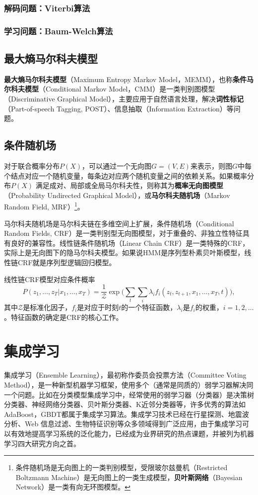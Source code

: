 \subsection{解码问题：Viterbi算法}
\subsection{学习问题：Baum-Welch算法}

\section{最大熵马尔科夫模型}
\noindent \textbf{最大熵马尔科夫模型}（Maximum Entropy Markov Model，MEMM），也称\textbf{条件马尔科夫模型}（Conditional Markov Model，CMM）是一类判别图模型（Discriminative Graphical Model），主要应用于自然语言处理，解决\textbf{词性标记}（Part-of-speech Tagging, POST）、信息抽取（Information Extraction）等问题。

\section{条件随机场}
\begin{definition}[概率无向图模型]
对于联合概率分布$P(X)$，可以通过一个无向图$G=(V,E)$来表示，则图$G$中每个结点对应一个随机变量，每条边对应两个随机变量之间的依赖关系。如果概率分布$P(X)$ 满足成对、局部或全局马尔科夫性，则称其为\textbf{概率无向图模型}（Probability Undirected Graphical Model），或\textbf{马尔科夫随机场}（Markov Random Field, MRF）\footnote{条件随机场是无向图上的一类判别模型，受限玻尔兹曼机（Restricted Boltzmann Machine）是无向图上的一类生成模型，\textbf{贝叶斯网络}（Bayesian Network）是一类有向无环图模型。}。
\end{definition}
马尔科夫随机场是马尔科夫链在多维空间上扩展，条件随机场（Conditional Random Fields, CRF）是一类判别型无向图模型，对于重叠的、非独立性特征具有良好的兼容性。线性链条件随机场（Linear Chain CRF）是一类特殊的CRF，实际上是无向图下的隐马尔科夫模型。如果说HMM是序列型朴素贝叶斯模型，线性链CRF就是序列型逻辑回归模型。

线性链CRF模型对应条件概率
\[
    P(z_1,\ldots,z_T|x_1,\ldots,x_T) = \frac{1}{\mathcal Z} \exp\bigg(\sum\limits_t \sum\limits_i \lambda_i f_i(z_t,z_{t+1},x_1,\ldots,x_T,t )\bigg),
\]
其中$\mathcal Z$是标准化因子，$f_i$是对应于时刻$t$的一个特征函数，$\lambda_i$是$f_i$的权重，$i=1,2,\ldots$。特征函数的确定是CRF的核心工作。

\chapter{集成学习}
集成学习（Ensemble Learning），最初称作委员会投票方法（Committee Voting Method），是一种新型机器学习框架，使用多个（通常是同质的）弱学习器解决同一个问题。比如在分类模型集成学习中，经常使用的弱学习器（分类器）是决策树分类器、神经网络分类器、贝叶斯分类器、K近邻分类器等，许多优秀的算法如AdaBoost，GBDT都属于集成学习算法。集成学习技术已经在行星探测、地震波分析、Web 信息过滤、生物特征识别等众多领域得到广泛应用，由于集成学习可以有效地提高学习系统的泛化能力，已经成为业界研究的热点课题，并被列为机器学习四大研究方向之首\cite{dietterich1997machine, ditterrich1997direction}。

